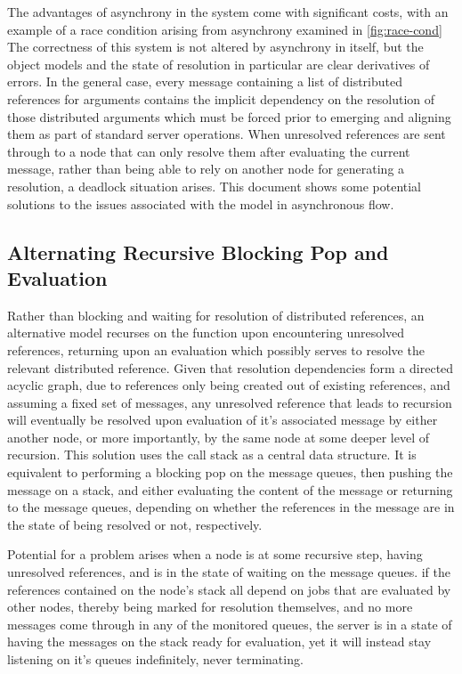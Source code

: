 The advantages of asynchrony in the system come with significant costs, with an
example of a race condition arising from asynchrony examined in \cref{fig:race-cond}
The correctness of this system is not altered by asynchrony in itself, but the
object models and the state of resolution in particular are clear derivatives
of errors.
In the general case, every message containing a list of distributed references
for arguments contains the implicit dependency on the resolution of those
distributed arguments which must be forced prior to emerging and aligning them
as part of standard server operations.
When unresolved references are sent through to a node that can only resolve
them after evaluating the current message, rather than being able to rely on
another node for generating a resolution, a deadlock situation arises.
This document shows some potential solutions to the issues associated with the
model in asynchronous flow.

\subsection{Alternating Recursive Blocking Pop and Evaluation} \label{recurs-stack}
Rather than blocking and waiting for resolution of distributed references, an
alternative model recurses on the  function upon
encountering unresolved references, returning upon an evaluation which possibly
serves to resolve the relevant distributed reference.
Given that resolution dependencies form a directed acyclic graph, due to
references only being created out of existing references, and assuming a fixed
set of messages, any unresolved reference that leads to recursion will
eventually be resolved upon evaluation of it's associated message by either
another node, or more importantly, by the same node at some deeper level of
recursion.
This solution uses the call stack as a central data structure.
It is equivalent to performing a blocking pop on the message queues, then
pushing the message on a stack, and either evaluating the content of the
message or returning to the message queues, depending on whether the references
in the message are in the state of being resolved or not, respectively.

Potential for a problem arises when a node is at some recursive step, having
unresolved references, and is in the state of waiting on the message queues.
if the references contained on the node's stack all depend on jobs that are
evaluated by other nodes, thereby being marked for resolution themselves, and
no more messages come through in any of the monitored queues, the server is in
a state of having the messages on the stack ready for evaluation, yet it will
instead stay listening on it's queues indefinitely, never terminating.

